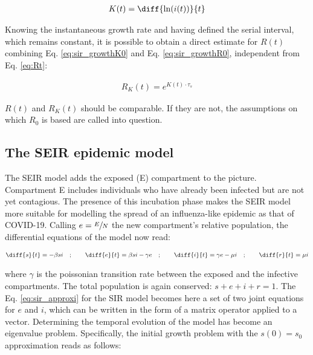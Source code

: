 \documentclass[DIV=12, BCOR=0pt]{scrartcl}  %
\begin{document}
  \begin{align}
  	K(t) =  \diff{\ln(i(t))}{t} %
  	\label{eq:Kt}
  \end{align}

	Knowing the instantaneous growth rate and having defined the serial interval, which remains constant, it is possible to obtain a direct estimate for $R(t)$ combining Eq. \ref{eq:sir_growthK0} and Eq. \ref{eq:sir_growthR0}, independent from Eq. \ref{eq:Rt}:

  \begin{align}
  	R_K(t) = e^{K(t) \cdot \tau_s}
  	\label{eq:RKt}
  \end{align}

	$R(t)$ and $R_K(t)$ should be comparable. If they are not, the assumptions on which $R_0$ is based are called into question.
  
  
  \subsection{The SEIR epidemic model}
  The SEIR model adds the exposed (E) compartment to the picture. Compartment E includes individuals who have already been infected but are not yet contagious. The presence of this incubation phase makes the SEIR model more suitable for modelling the spread of an influenza-like epidemic as that of COVID-19. 
  Calling $e = \sfrac{E}{N}$ the new compartment's relative population, the differential equations of the model now read:
  
  \begin{align}
  	\diff{s}{t} = - \beta s i \quad;  \qquad 	\diff{e}{t} = \beta s i - \gamma e \quad; \qquad \diff{i}{t} = \gamma e - \mu i \quad; \qquad \diff{r}{t} = \mu i
  	\label{eq:seir}
  \end{align}

   where $\gamma$ is the poissonian transition rate between the exposed and the infective compartments. The total population is again conserved: $ s + e + i + r = 1$. 
  The Eq. \ref{eq:sir_approxi} for the SIR model becomes here a set of two joint equations for $e$ and $i$, which can be written in the form of a matrix operator applied to a vector. Determining the temporal evolution of the model has become an eigenvalue problem. Specifically, the initial growth problem with the $s(0) = s_0$ approximation reads as follows: 
  
\end{document}
